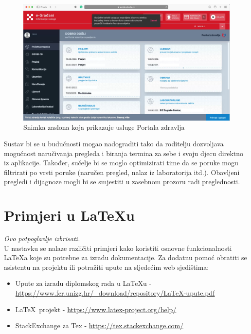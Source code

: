 		\begin{figure}[H]
			\includegraphics[width=\textwidth]{slike/portalZdravlja.PNG} %
			\caption{Snimka zaslona koja prikazuje usluge Portala zdravlja}
		\end{figure}
		
		Sustav bi se u budućnosti mogao nadograditi tako da roditelju dozvoljava mogućnost naručivanja pregleda i biranja termina za sebe i svoju djecu direktno iz aplikacije. Također, sučelje bi se moglo optimizirati time da se poruke mogu filtrirati po vrsti poruke (naručen pregled, nalaz iz laboratorija itd.). Obavljeni pregledi i dijagnoze mogli bi se smjestiti u zasebnom prozoru radi preglednosti. 
		
		\section{Primjeri u \LaTeX u}
		
		\textit{Ovo potpoglavlje izbrisati.}\\

		U nastavku se nalaze različiti primjeri kako koristiti osnovne funkcionalnosti \LaTeX a koje su potrebne za izradu dokumentacije. Za dodatnu pomoć obratiti se asistentu na projektu ili potražiti upute na sljedećim web sjedištima:
		\begin{itemize}
			\item Upute za izradu diplomskog rada u \LaTeX u - \url{https://www.fer.unizg.hr/_download/repository/LaTeX-upute.pdf}
			\item \LaTeX\ projekt - \url{https://www.latex-project.org/help/}
			\item StackExchange za Tex - \url{https://tex.stackexchange.com/}\\
		
		\end{itemize} 	


